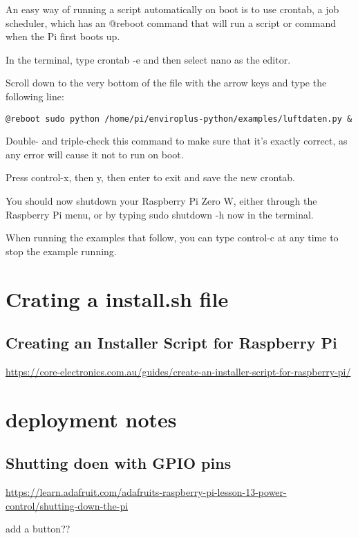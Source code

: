 \documentclass{article}
\begin{document}
An easy way of running a script automatically on boot is to use crontab, a job scheduler, which has an @reboot command that will run a script or command when the Pi first boots up.

In the terminal, type crontab -e and then select nano as the editor.

Scroll down to the very bottom of the file with the arrow keys and type the following line:


\begin{verbatim}
@reboot sudo python /home/pi/enviroplus-python/examples/luftdaten.py &
\end{verbatim}

Double- and triple-check this command to make sure that it's exactly correct, as any error will cause it not to run on boot.

Press control-x, then y, then enter to exit and save the new crontab.

You should now shutdown your Raspberry Pi Zero W, either through the Raspberry Pi menu, or by typing sudo shutdown -h now in the terminal.


When running the examples that follow, you can type control-c at any time to stop the example running.

\section{Crating a install.sh file}

\subsection{Creating an Installer Script for Raspberry Pi}


\url{https://core-electronics.com.au/guides/create-an-installer-script-for-raspberry-pi/}



\section{deployment notes}

\subsection{Shutting doen with GPIO pins}

\url{https://learn.adafruit.com/adafruits-raspberry-pi-lesson-13-power-control/shutting-down-the-pi}

add a button??
\end{document}

